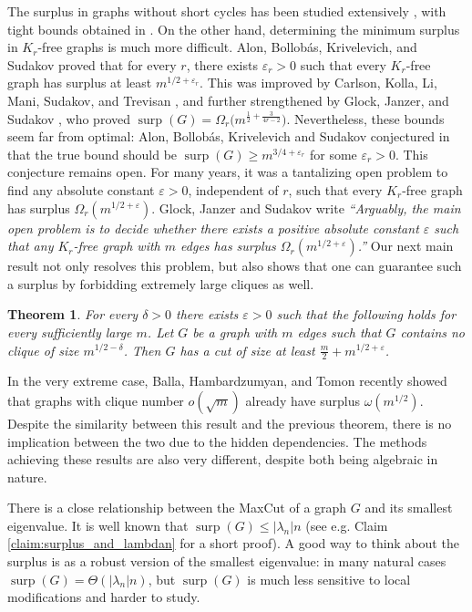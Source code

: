 \documentclass[11pt]{article}
\theoremstyle{plain}
\newtheorem{theorem}{Theorem}[section]
\theoremstyle{definition}
\DeclareMathOperator{\surp}{surp}
\newcommand{\eps}{\varepsilon}
\begin{document}
The surplus in graphs without short cycles has been studied extensively \cite{ABKS,AKS05,BJS,GJS}, with tight bounds obtained in \cite{BJS,GJS}. 
On the other hand, determining the minimum surplus in $K_r$-free graphs is much more difficult. 
Alon, Bollob\'as, Krivelevich, and Sudakov \cite{ABKS} proved that for every $r$, there exists $\eps_r>0$ such that every $K_r$-free graph has surplus at least $m^{1/2+\eps_r}$. 
This was improved by Carlson, Kolla, Li, Mani, Sudakov, and Trevisan \cite{CKLMST}, and further strengthened by Glock, Janzer, and Sudakov \cite{GJS}, who proved $\surp(G)=\Omega_r\big(m^{\frac{1}{2}+\frac{3}{4r-2}}\big)$. Nevertheless, these bounds seem far from optimal: Alon, Bollob\'as, Krivelevich and Sudakov conjectured in \cite{ABKS} that the true bound should be $\surp(G)\geq m^{3/4+\eps_r}$ for some $\eps_r>0$. This conjecture remains open. For many years, it was a tantalizing open problem to find any absolute constant $\eps>0$, independent of $r$, such that every $K_r$-free graph has surplus $\Omega_r(m^{1/2+\eps})$. Glock, Janzer and Sudakov \cite{GJS} write \textit{``Arguably, the main open problem is to decide whether there exists a positive absolute constant $\eps$ such that any $K_r$-free graph with $m$ edges has surplus $\Omega_r(m^{1/2+\eps})$.''} Our next main result not only resolves this problem, but also shows that one can guarantee such a surplus by forbidding extremely large cliques as well.

\begin{theorem}\label{thm:MAIN_MC1}
For every $\delta>0$ there exists $\eps>0$ such that the following holds for every sufficiently large $m$. Let $G$ be a graph with $m$ edges such that $G$ contains no clique of size $m^{1/2-\delta}$. Then $G$ has a cut of size at least $\frac{m}{2}+m^{1/2+\eps}$. 
\end{theorem}

In the very extreme case, Balla, Hambardzumyan, and Tomon \cite{BHT} recently showed that graphs with clique number $o(\sqrt{m})$ already have surplus $\omega(m^{1/2})$. Despite the similarity between this result and the previous theorem, there is no implication between the two due to the hidden dependencies. The methods achieving these results are also very different, despite both being algebraic in nature. 

There is a close relationship between the MaxCut of a graph $G$ and its smallest eigenvalue. It is well known that $\surp(G)\leq |\lambda_n|n$ (see e.g. Claim \ref{claim:surplus_and_lambdan} for a short proof). %
A good way to think about the surplus is as a robust version of the smallest eigenvalue: in many natural cases $\surp(G)=\Theta(|\lambda_n|n)$, but $\surp(G)$ is much less sensitive to local modifications and harder to study.
\end{document}

